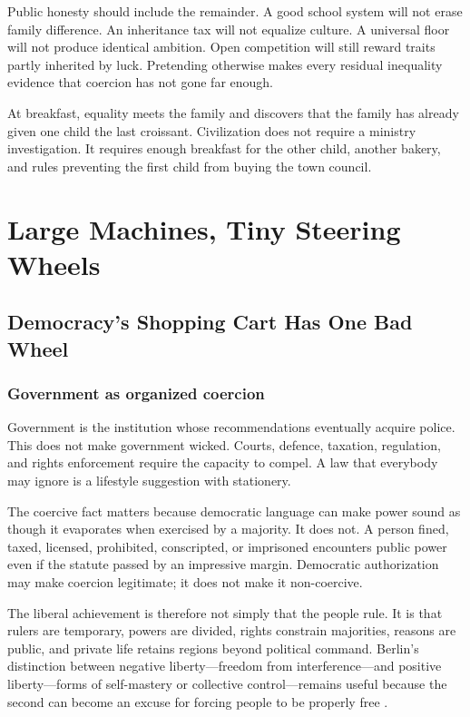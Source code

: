 \documentclass[12pt,a4paper]{book}
\begin{document}
Public honesty should include the remainder.  A good school system will not
erase family difference.  An inheritance tax will not equalize culture.  A
universal floor will not produce identical ambition.  Open competition will
still reward traits partly inherited by luck.  Pretending otherwise makes
every residual inequality evidence that coercion has not gone far enough.

At breakfast, equality meets the family and discovers that the family has
already given one child the last croissant.  Civilization does not require a
ministry investigation.  It requires enough breakfast for the other child,
another bakery, and rules preventing the first child from buying the town
council.

\part{Large Machines, Tiny Steering Wheels}

\chapter{Democracy's Shopping Cart Has One Bad Wheel}
\label{chap:democracy-shopping-cart}

\section{Government as organized coercion}

Government is the institution whose recommendations eventually acquire police.
This does not make government wicked.  Courts, defence, taxation, regulation,
and rights enforcement require the capacity to compel.  A law that everybody
may ignore is a lifestyle suggestion with stationery.

The coercive fact matters because democratic language can make power sound as
though it evaporates when exercised by a majority.  It does not.  A person
fined, taxed, licensed, prohibited, conscripted, or imprisoned encounters public
power even if the statute passed by an impressive margin.  Democratic
authorization may make coercion legitimate; it does not make it non-coercive.

The liberal achievement is therefore not simply that the people rule.  It is
that rulers are temporary, powers are divided, rights constrain majorities,
reasons are public, and private life retains regions beyond political command.
Berlin's distinction between negative liberty---freedom from interference---and
positive liberty---forms of self-mastery or collective control---remains useful
because the second can become an excuse for forcing people to be properly free
\cite{berlin-liberty}.
\end{document}
